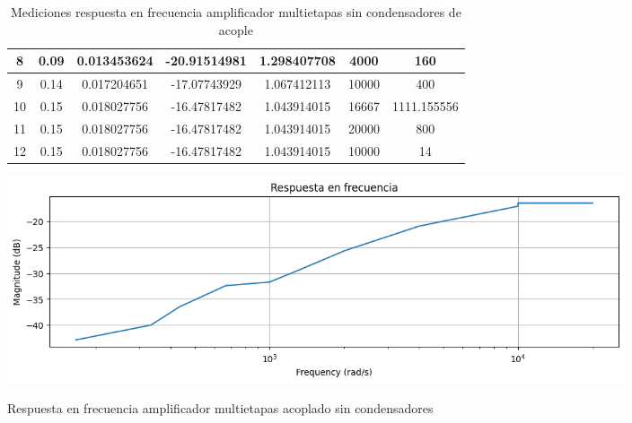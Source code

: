 \begin{table}[h!]
\begin{tabular}{|c|c|c|c|c|c|c|}
8 & 0.09 & 0.013453624 & -20.91514981 & 1.298407708 & 4000 & 160 \\ \hline
9 & 0.14 & 0.017204651 & -17.07743929 & 1.067412113 & 10000 & 400 \\ \hline
10 & 0.15 & 0.018027756 & -16.47817482 & 1.043914015 & 16667 & 1111.155556 \\ \hline
11 & 0.15 & 0.018027756 & -16.47817482 & 1.043914015 & 20000 & 800 \\ \hline
12 & 0.15 & 0.018027756 & -16.47817482 & 1.043914015 & 10000 & 14 \\ \hline
\end{tabular}
\caption{Mediciones respuesta en frecuencia amplificador multietapas sin condensadores de acople}
\label{tab:med-respuesta-frecuencia-amplificador-multietapas-sin-condensadores-acople}
\end{table}

\begin{ilustracion}[ht]
    \centering
    \includegraphics[width=0.8\textwidth]{src/images/resultados/p4/respuesta en frecuencia practica 4 sin condensadores de acople.png}
    \caption{Respuesta en frecuencia amplificador multietapas acoplado sin condensadores}
    \label{ilus:respuesta-frecuencia-amplificador-multietapas-acoplado-sin-condensadores}
\end{ilustracion}
